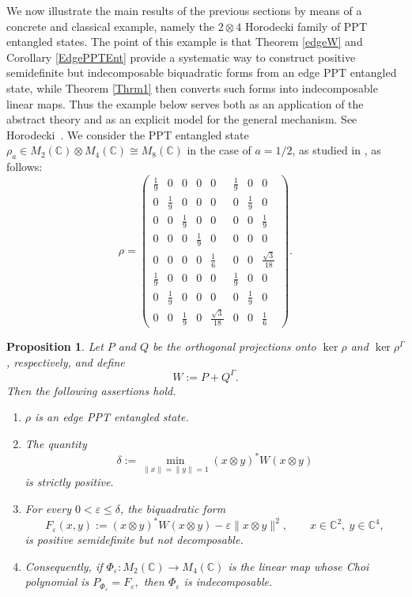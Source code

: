 \documentclass[12pt,a4paper]{amsart}
\theoremstyle{plain}
\newtheorem{proposition}[theorem]{Proposition}
\theoremstyle{remark}
\theoremstyle{definition}
\begin{document}
We now illustrate the main results of the previous sections by means of a concrete and classical example, namely the $2\otimes 4$ Horodecki family of PPT entangled states. The point of this example is that Theorem \ref{edgeW} and Corollary \ref{EdgePPTEnt} provide a systematic way to construct positive semidefinite but indecomposable biquadratic forms from an edge PPT entangled state, while Theorem \ref{Thrm1} then converts such forms into indecomposable linear maps. Thus the example below serves both as an application of the abstract theory and as an explicit model for the general mechanism. See Horodecki~\cite{Horodecki1997}.
We consider the PPT entangled state $\rho_a  \in M_2(\mathbb C)\otimes M_4(\mathbb C)\cong M_8(\mathbb C)$ in the case of $a=1/2$, as studied in \cite{Horodecki1997}, as follows:
\[
\rho=
\begin{pmatrix}
\frac19 & 0 & 0 & 0 & 0 & \frac19 & 0 & 0 \\
0 & \frac19 & 0 & 0 & 0 & 0 & \frac19 & 0 \\
0 & 0 & \frac19 & 0 & 0 & 0 & 0 & \frac19 \\
0 & 0 & 0 & \frac19 & 0 & 0 & 0 & 0 \\
0 & 0 & 0 & 0 & \frac16 & 0 & 0 & \frac{\sqrt3}{18} \\
\frac19 & 0 & 0 & 0 & 0 & \frac19 & 0 & 0 \\
0 & \frac19 & 0 & 0 & 0 & 0 & \frac19 & 0 \\
0 & 0 & \frac19 & 0 & \frac{\sqrt3}{18} & 0 & 0 & \frac16
\end{pmatrix}.
\]
\begin{proposition}
Let \(P\) and \(Q\) be the orthogonal projections onto \(\ker\rho\) and \(\ker\rho^\Gamma\), respectively, and define
\[
W:=P+Q^\Gamma.
\]
Then the following assertions hold.

\begin{enumerate}
\item[\rm (i)] \(\rho\) is an edge PPT entangled state.
\item[\rm (ii)] The quantity
\[
\delta:=\min_{\|x\|=\|y\|=1}(x\otimes y)^*W(x\otimes y)
\]
is strictly positive.
\item[\rm (iii)] For every \(0<\varepsilon\le \delta\), the biquadratic form
\[
F_\varepsilon(x,y):=(x\otimes y)^*W(x\otimes y)-\varepsilon\|x\otimes y\|^2,
\qquad x\in\mathbb C^2,\ y\in\mathbb C^4,
\]
is positive semidefinite but not decomposable.
\item[\rm (iv)] Consequently, if \(\Phi_\varepsilon:M_2(\mathbb C)\to M_4(\mathbb C)\) is the linear map whose Choi polynomial is
$P_{\Phi_\varepsilon}=F_\varepsilon,$
then \(\Phi_\varepsilon\) is indecomposable.
\end{enumerate}
\end{proposition}
\end{document}
